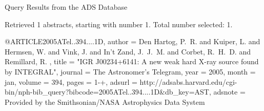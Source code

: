 Query Results from the ADS Database


Retrieved 1 abstracts, starting with number 1.  Total number selected: 1.

@ARTICLE{2005ATel..394....1D,
   author = {{Den Hartog}, P.~R. and {Kuiper}, L. and {Hermsen}, W. and {Vink}, J. and 
	{In't Zand}, J.~J.~M. and {Corbet}, R.~H.~D. and {Remillard}, R.
	},
    title = "{IGR J00234+6141: A new weak hard X-ray source found by INTEGRAL}",
  journal = {The Astronomer's Telegram},
     year = 2005,
    month = jan,
   volume = 394,
    pages = {1-+},
   adsurl = {http://adsabs.harvard.edu/cgi-bin/nph-bib_query?bibcode=2005ATel..394....1D&db_key=AST},
  adsnote = {Provided by the Smithsonian/NASA Astrophysics Data System}
}


